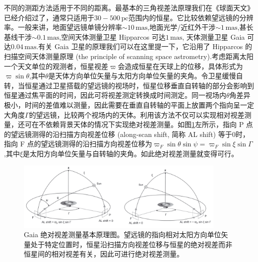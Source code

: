 \documentclass[../天体物理基础.tex]{subfiles}
\begin{document}
不同的测距方法适用于不同的距离。最基本的三角视差法原理我们在《球面天文》已经介绍过了，通常只适用于$30-500\,\mathrm{pc}$范围内的恒星。它比较依赖望远镜的分辨率。一般来讲，地面望远镜单镜分辨率$\sim10\,\mathrm{mas}$,地面光学/近红外干涉$\sim1\,\mathrm{mas}$,甚长基线干涉$\sim0.1\,\mathrm{mas}$,空间天体测量卫星 Hipparcos 可达$1\,\mathrm{mas}$, 天体测量卫星 Gaia 可达$0.04\,\mathrm{mas}$.有关 Gaia 卫星的原理我们可以在这里提一下，它沿用了 Hipparcos 的扫描空间天体测量原理 (the principle of scanning space astrometry).考虑距离太阳一个天文单位的观测者，恒星视差$\varpi$会造成恒星在天球上的位移，具体形式为$\varpi\sin\theta$,其中$\theta$是天体方向单位矢量与太阳方向单位矢量的夹角。令卫星缓慢自转，当恒星通过卫星搭载的望远镜的视场时，恒星位移垂直自转轴的部分会影响到恒星通过焦平面的时间，因此可将视差测定转换成时间测定。同一视场内$\theta$角差异极小，时间的差值难以测量，因此需要在垂直自转轴的平面上放置两个指向呈一定大角度$\Gamma$的望远镜，比较两个视场内的天体。利用该方法不仅可以实现相对视差测量，还可在不依赖背景天体的情况下实现绝对视差测量。如图\ref{absolute_parallax}左所示，指向 P 点的望远镜测得的沿扫描方向视差位移 (along-scan shift, 简称 AL shift) 等于$0$时，指向 F 点的望远镜测得的沿扫描方向视差位移为$\varpi_{F}\sin\theta\sin\psi=\varpi_{F}\sin\xi\sin\Gamma$,其中$\xi$是太阳方向单位矢量与自转轴的夹角。如此绝对视差测量就变得可行。
\begin{figure}[!htp]
\centering
\includegraphics[width=0.9\textwidth]{figures/figure1_19.png}
\captionsetup{justification=raggedright, singlelinecheck=false}
\caption{Gaia 绝对视差测量基本原理图。望远镜的指向相对太阳方向单位矢量处于特定位置时，恒星沿扫描方向视差位移与恒星的绝对视差而非恒星间的相对视差有关，因此可进行绝对视差测量。}
\label{absolute_parallax}
\end{figure}
\end{document}
